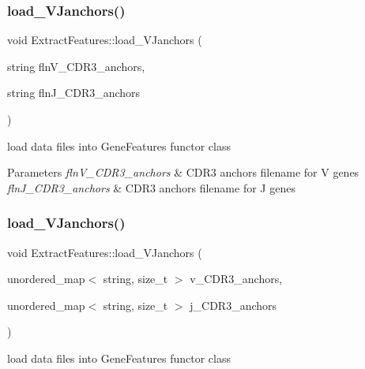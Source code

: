 \subsubsection{\texorpdfstring{load\+\_\+\+V\+Janchors()}{load\_VJanchors()}\hspace{0.1cm}{\footnotesize\ttfamily [1/2]}}
{\footnotesize\ttfamily void Extract\+Features\+::load\+\_\+\+V\+Janchors (\begin{DoxyParamCaption}\item[{string}]{fln\+V\+\_\+\+C\+D\+R3\+\_\+anchors,  }\item[{string}]{fln\+J\+\_\+\+C\+D\+R3\+\_\+anchors }\end{DoxyParamCaption})}



load data files into Gene\+Features functor class 


\begin{DoxyParams}{Parameters}
{\em fln\+V\+\_\+\+C\+D\+R3\+\_\+anchors} & C\+D\+R3 anchors filename for V genes \\
\hline
{\em fln\+J\+\_\+\+C\+D\+R3\+\_\+anchors} & C\+D\+R3 anchors filename for J genes \\
\hline
\end{DoxyParams}
\mbox{\label{classExtractFeatures_ace6992bcea2ed1008b5a103291f039c4}} 
\subsubsection{\texorpdfstring{load\+\_\+\+V\+Janchors()}{load\_VJanchors()}\hspace{0.1cm}{\footnotesize\ttfamily [2/2]}}
{\footnotesize\ttfamily void Extract\+Features\+::load\+\_\+\+V\+Janchors (\begin{DoxyParamCaption}\item[{unordered\+\_\+map$<$ string, size\+\_\+t $>$}]{v\+\_\+\+C\+D\+R3\+\_\+anchors,  }\item[{unordered\+\_\+map$<$ string, size\+\_\+t $>$}]{j\+\_\+\+C\+D\+R3\+\_\+anchors }\end{DoxyParamCaption})}



load data files into Gene\+Features functor class 


